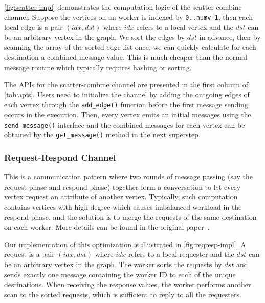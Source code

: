 \documentclass{sokendai_thesis} %
\begin{document}
\autoref{fig:scatter-impl} demonstrates the computation logic of the scatter-combine channel.
Suppose the vertices on an worker is indexed by \texttt{0..numv-1}, then each local edge is a pair $(idx, dst)$ where $idx$ refers to a local vertex and the $dst$ can be an arbitrary vertex in the graph.
We sort the edges by $dst$ in advance, then by scanning the array of the sorted edge list once, we can quickly calculate for each destination a combined message value.
This is much cheaper than the normal message routine which typically requires hashing or sorting.




The APIs for the scatter-combine channel are presented in the first column of \autoref{tab:apis}.
Users need to initialize the channel by adding the outgoing edges of each vertex through the \texttt{add\_edge()} function before the first message sending occurs in the execution.
Then, every vertex emits an initial messages using the \texttt{send\_message()} interface and the combined messages for each vertex can be obtained by the \texttt{get\_message()} method in the next superstep.

\subsubsection{Request-Respond Channel}
\label{sec:request-respond}

This is a communication pattern where two rounds of message passing (say the request phase and respond phase) together form a conversation to let every vertex request an attribute of another vertex.
Typically, such computation contains vertices with high degree which causes imbalanced workload in the respond phase, and the solution is to merge the requests of the same destination on each worker.
More details can be found in the original paper~\cite{yan2015effective}.

Our implementation of this optimization is illustrated in \autoref{fig:reqresp-impl}.
A request is a pair $(idx, dst)$ where $idx$ refers to a local requester and the $dst$ can be an arbitrary vertex in the graph.
The worker sorts the requests by $dst$ and sends exactly one message containing the worker ID to each of the unique destinations.
When receiving the response values, the worker performs another scan to the sorted requests, which is sufficient to reply to all the requesters.
\end{document}
